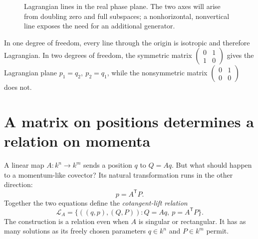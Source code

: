 \begin{figure}[H]
\centering
{}
\caption{Lagrangian lines in the real phase plane. The two axes will arise from doubling zero and full subspaces; a nonhorizontal, nonvertical line exposes the need for an additional generator.}
\end{figure}

In one degree of freedom, every line through the origin is isotropic and therefore Lagrangian. In two degrees of freedom, the symmetric matrix
\(\begin{pmatrix}0&1\\1&0\end{pmatrix}\) gives the Lagrangian plane
\(p_1=q_2,\ p_2=q_1\), while the nonsymmetric matrix
\(\begin{pmatrix}0&1\\0&0\end{pmatrix}\) does not.

\section{A matrix on positions determines a relation on momenta}

A linear map \(A:k^n\to k^m\) sends a position \(q\) to \(Q=Aq\). But what should happen to a momentum-like covector? Its natural transformation runs in the other direction:
\[
 p=A^{\mathsf T}P.
\]
Together the two equations define the \emph{cotangent-lift relation}
\[
 \boxed{\mathcal L_A=
 \{((q,p),(Q,P)):Q=Aq,\ p=A^{\mathsf T}P\}.}
\]
The construction is a relation even when \(A\) is singular or rectangular. It has as many solutions as its freely chosen parameters \(q\in k^n\) and \(P\in k^m\) permit.

